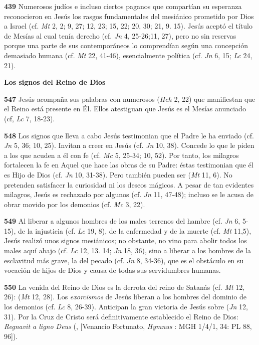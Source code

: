 \begin{body}
\begin{body}
\textbf{439} Numerosos judíos e incluso ciertos paganos que compartían su esperanza reconocieron en Jesús los rasgos fundamentales del mesiánico  prometido por Dios a Israel (cf. \emph{Mt} 2, 2; 9, 27; 12, 23; 15, 22; 20, 30; 21, 9. 15). Jesús aceptó el título de Mesías al cual tenía derecho (cf. \emph{Jn} 4, 25-26;11, 27), pero no sin reservas porque una parte de sus contemporáneos lo comprendían según una concepción demasiado humana (cf. \emph{Mt} 22, 41-46), esencialmente política (cf. \emph{Jn} 6, 15; \emph{Lc} 24, 21).

\textbf{Los signos del Reino de Dios}

\textbf{547} Jesús acompaña sus palabras con numerosos  (\emph{Hch} 2, 22) que manifiestan que el Reino está presente en Él. Ellos atestiguan que Jesús es el Mesías anunciado (cf, \emph{Lc} 7, 18-23).

\textbf{548} Los signos que lleva a cabo Jesús testimonian que el Padre le ha enviado (cf. \emph{Jn} 5, 36; 10, 25). Invitan a creer en Jesús (cf. \emph{Jn} 10, 38). Concede lo que le piden a los que acuden a él con fe (cf. \emph{Mc} 5, 25-34; 10, 52). Por tanto, los milagros fortalecen la fe en Aquel que hace las obras de su Padre: éstas testimonian que él es Hijo de Dios (cf. \emph{Jn} 10, 31-38). Pero también pueden ser  (\emph{Mt} 11, 6). No pretenden satisfacer la curiosidad ni los deseos mágicos. A pesar de tan evidentes milagros, Jesús es rechazado por algunos (cf. \emph{Jn} 11, 47-48); incluso se le acusa de obrar movido por los demonios (cf. \emph{Mc} 3, 22).

\textbf{549} Al liberar a algunos hombres de los males terrenos del hambre (cf. \emph{Jn} 6, 5-15), de la injusticia (cf. \emph{Lc} 19, 8), de la enfermedad y de la muerte (cf. \emph{Mt} 11,5), Jesús realizó unos signos mesiánicos; no obstante, no vino para abolir todos los males aquí abajo (cf. \emph{Lc} 12, 13. 14; \emph{Jn} 18, 36), sino a liberar a los hombres de la esclavitud más grave, la del pecado (cf. \emph{Jn} 8, 34-36), que es el obstáculo en su vocación de hijos de Dios y causa de todas sus servidumbres humanas.

\textbf{550} La venida del Reino de Dios es la derrota del reino de Satanás (cf. \emph{Mt} 12, 26):  (\emph{Mt} 12, 28). Los \emph{exorcismos} de Jesús liberan a los hombres del dominio de los demonios (cf. \emph{Lc} 8, 26-39). Anticipan la gran victoria de Jesús sobre  (\emph{Jn} 12, 31). Por la Cruz de Cristo será definitivamente establecido el Reino de Dios: \emph{Regnavit a ligno Deus} (, {[}Venancio Fortunato, \emph{Hymnus }: MGH 1/4/1, 34: PL 88, 96{]}).


\end{body}
\end{body}

